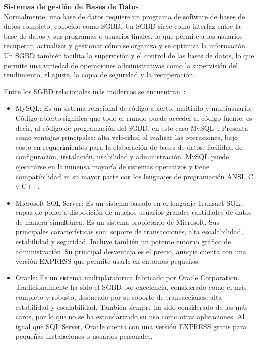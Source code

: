 \textbf{Sistemas de gestión de Bases de Datos} \\
Normalmente, una base de datos requiere un programa de software de bases de datos completo, conocido como SGBD. Un SGBD sirve como interfaz entre la base de datos y sus programas o usuarios finales, lo que permite a los  usuarios recuperar, actualizar y gestionar cómo se organiza y se optimiza la información. Un SGBD también facilita la supervisión y el control de las bases de datos, lo que permite una variedad de operaciones administrativas como la supervisión del rendimiento, el ajuste, la copia de seguridad y la recuperación.~\cite{Quéesuna68}

Entre los SGBD relacionales más modernos se encuentran~\cite{Losgesto13}:
\begin{itemize}
    \item MySQL: Es un sistema relacional de código abierto, multihilo y multiusuario. Código abierto significa que todo el mundo puede acceder al código fuente, es decir, al código de programación del SGBD, en este caso MySQL~\cite{ian2003biblia}. Presenta como ventajas principales: alta velocidad al realizar las operaciones, bajo costo en requerimientos para la elaboración de bases de datos, facilidad de configuración, instalación, usabilidad y administración. MySQL puede ejecutarse en la inmensa mayoría de sistemas operativos y tiene compatibilidad en su mayor parte con los lenguajes de programación ANSI, C y C++.
    
    \item Microsoft SQL Server: Es un sistema basado en el lenguaje Transact-SQL, capaz de poner a disposición de muchos usuarios grandes cantidades de datos de manera simultánea. Es un sistema propietario de Microsoft. Sus principales características son: soporte de transacciones, alta escalabilidad, estabilidad y seguridad. Incluye también un potente entorno gráfico de administración. Su principal desventaja es el precio, aunque cuenta con una versión EXPRESS que permite usarlo en entornos pequeños.
    
    \item Oracle: Es un sistema multiplataforma fabricado por Oracle Corporation. Tradicionalmente ha sido el SGBD por excelencia, considerado como el más completo y robusto; destacado por su soporte de transacciones, alta estabilidad y escalabilidad. También siempre ha sido considerado de los más caros, por lo que no se ha estandarizado su uso como otras aplicaciones. Al igual que SQL Server, Oracle cuenta con una versión EXPRESS gratis para pequeñas instalaciones o usuarios personales.
    

\end{itemize}
